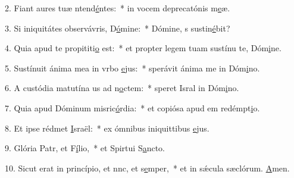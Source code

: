 2. Fiant aures tuæ ntend\uline{é}ntes:~* in vocem deprecatónis m\uline{e}æ.\par 
3. Si iniquitátes observávris, D\uline{ó}mine:~* Dómine, s sustin\uline{é}bit?\par 
4. Quia apud te propititi\uline{o} est:~* et propter legem tuam sustínu te, Dóm\uline{i}ne.\par 
5. Sustínuit ánima mea in vrbo \uline{e}jus:~* sperávit ánima me in Dóm\uline{i}no.\par 
6. A custódia matutína us ad n\uline{o}ctem:~* speret Isral in Dóm\uline{i}no.\par 
7. Quia apud Dóminum misric\uline{ó}rdia:~* et copiósa apud em redémpt\uline{i}o.\par 
8. Et ipse rédmet \uline{I}sraël:~* ex ómnibus iniquittibus \uline{e}jus.\par 
9. Glória Patr, et F\uline{í}lio,~* et Spirtui S\uline{a}ncto.\par 
10. Sicut erat in princípio, et nnc, et s\uline{e}mper,~* et in sǽcula sæclórum. \uline{A}men.\par 
